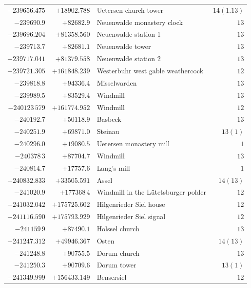 \begin{center}
\begin{tabular}{r|r|p{170pt}|r}
\(-239656.475\)&\(+18902.788\)&Uetersen church tower&\(14(1.13)\)\\
\(-239690.9\)&\(+82682.9\)&Neuenwalde monastery clock&\(13\)\\
\(-239696.204\)&\(+81358.560\)&Neuenwalde station 1&\(13\)\\
\(-239713.7\)&\(+82681.1\)&Neuenwalde tower&\(13\)\\
\(-239717.041\)&\(+81379.558\)&Neuenwalde station 2&\(13\)\\
\(-239721.305\)&\(+161848.239\)&Westerbuhr west gable weathercock&\(12\)\\
\(-239818.8\)&\(+94336.4\)&Misselwarden&\(13\)\\
\(-239989.5\)&\(+83529.4\)&Windmill&\(13\)\\
\(-240123\,579\)&\(+161774.952\)&Windmill&\(12\)\\
\(-240192.7\)&\(+50118.9\)&Basbeck&\(13\)\\
\(-240251.9\)&\(+69871.0\)&Steinau&\(13(1)\)\\
\(-240296.0\)&\(+19080.5\)&Uetersen monastery mill&\(1\)\\
\(-240378\,3\)&\(+87704.7\)&Windmill&\(13\)\\
\(-240814.7\)&\(+17757.6\)&Lang’s mill&\(1\)\\
\(-240832.833\)&\(+33505.591\)&Assel&\(14(13)\)\\
\(-241020.9\)&\(+177368\,4\)&Windmill in the Lütetsburger polder&\(12\)\\
\(-241032.042\)&\(+175725.602\)&Hilgenrieder Siel house&\(12\)\\
\(-241116.590\)&\(+175793.929\)&Hilgenrieder Siel signal&\(12\)\\
\(-241159\,9\)&\(+87490.1\)&Holssel church&\(13\)\\
\(-241247.312\)&\(+49946.367\)&Osten&\(14(13)\)\\
\(-241248.8\)&\(+90755.5\)&Dorum church&\(13\)\\
\(-241250.3\)&\(+90709.6\)&Dorum tower&\(13(1)\)\\
\(-241349.999\)&\(+156433.149\)&Bensersiel&\(12\)\\
\hline\end{tabular}\endgroup\end{center}
\clearpage
